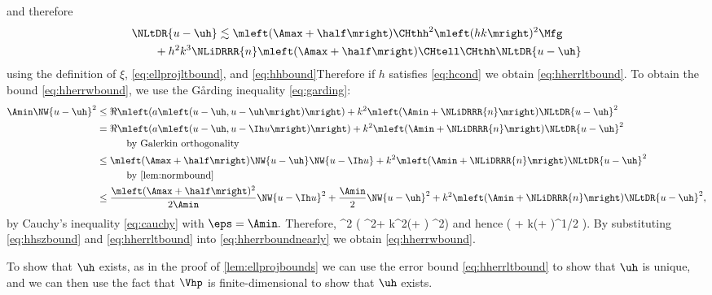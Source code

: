 and therefore
\begin{align*}
&  \NLtDR{u-\uh} \lesssim \mleft(\Amax + \half\mright)\CHthh^2 \mleft(hk\mright)^2 \Mfg\\
&\quad\quad  + h^2k^3 \NLiDRRR{n} \mleft(\Amax + \half\mright) \CHtell \CHthh \NLtDR{u-\uh}
\end{align*}
  using the definition of $\xi$, \eqref{eq:ellprojltbound}, and \eqref{eq:hhbound}Therefore if $h$ satisfies \eqref{eq:hcond} we obtain \eqref{eq:hherrltbound}.
To obtain the bound \eqref{eq:hherrwbound}, we use the G\r{a}rding inequality \eqref{eq:garding}:
\begin{align*}
  \Amin \NW{u-\uh}^2 &\leq \Re\mleft(a\mleft(u-\uh,u-\uh\mright)\mright) + k^2\mleft(\Amin+ \NLiDRRR{n}\mright) \NLtDR{u-\uh}^2\\
                     &= \Re\mleft(a\mleft(u-\uh,u-\Ih u\mright)\mright) + k^2\mleft(\Amin+ \NLiDRRR{n}\mright) \NLtDR{u-\uh}^2\\
  &\quad\quad\quad\text{by Galerkin orthogonality}\\
                     &\leq \mleft(\Amax+\half\mright) \NW{u-\uh}\NW{u-\Ih u} + k^2\mleft(\Amin+ \NLiDRRR{n}\mright) \NLtDR{u-\uh}^2\\
  &\quad\quad\quad\text{by \cref{lem:normbound}}\\
  &\leq \frac{\mleft(\Amax+\half\mright)^2}{2\Amin} \NW{u-\Ih u}^2 + \frac{\Amin}2 \NW{u-\uh}^2 + k^2\mleft(\Amin+ \NLiDRRR{n}\mright) \NLtDR{u-\uh}^2,\\
\end{align*}
by Cauchy's inequality \eqref{eq:cauchy} with $\eps = \Amin.$ Therefore,
\beqs
{}^2 \leq {} \mleft( ^2+ k^2\mleft(\Amin+ \mright) ^2\mright)
\eeqs
and hence
\beq\label{eq:hherrboundnearly}
 \lesssim {} \mleft( + k\mleft(\Amin+ \mright)^{1/2} \mright).
\eeq
By substituting \eqref{eq:hhszbound} and \eqref{eq:hherrltbound} into \eqref{eq:hherrboundnearly} we obtain \eqref{eq:hherrwbound}.

To show that $\uh$ exists, as in the proof of \cref{lem:ellprojbounds} we can use the error bound \eqref{eq:hherrltbound} to show that $\uh$ is unique, and we can then use the fact that $\Vhp$ is finite-dimensional to show that $\uh$ exists.
\epf



